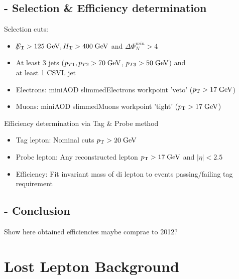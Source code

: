 \documentclass{beamer}
\begin{document}
\subsection{\Zll - Selection \& Efficiency determination}
\begin{frame}
Selection cuts:
\begin{itemize}
 \item $\slash\mkern-12mu{E}_{\text{T}} > 125 \;\text{Ge}\kern-0.06667em\text{V}, H_{\text{T}} > 400 \;\text{Ge}\kern-0.06667em\text{V} $ and $\Delta\Phi_{N}^{min}>4$
 \item At least 3 jets ($p_{T\text{1}},p_{T\text{2}} > 70\;\text{Ge}\kern-0.06667em\text{V}$, $p_{T\text{3}} > 50\;\text{Ge}\kern-0.06667em\text{V}$) and \\ at least 1 CSVL jet
 \item Electrons: miniAOD slimmedElectrons workpoint 'veto' ($p_{\text{T}}>17\;\text{Ge}\kern-0.06667em\text{V}$)
 \item Muons: miniAOD slimmedMuons workpoint 'tight' ($p_{\text{T}}>17\;\text{Ge}\kern-0.06667em\text{V}$)
\end{itemize}
Efficiency determination via Tag \& Probe method
\begin{itemize}
 \item Tag lepton: Nominal cuts $p_{\text{T}}>20\;\text{Ge}\kern-0.06667em\text{V}$
 \item Probe lepton: Any reconstructed lepton $p_{\text{T}}>17\;\text{Ge}\kern-0.06667em\text{V}$ and $|\eta|<2.5$
 \item Efficiency: Fit invariant mass of di lepton to events passing/failing tag requirement 
\end{itemize}
\end{frame}

\subsection{\Zll - Conclusion}
\begin{frame}
Show here obtained efficiencies maybe comprae to 2012?
\end{frame}


\section{Lost Lepton Background }
\end{document}
